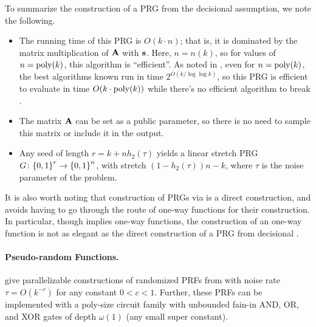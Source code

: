 To summarize the construction of a PRG from the decisional \LPN assumption, we note the following.
\begin{itemize}
	\item The running time of this PRG is $O(k\cdot n)$; that is, it is dominated by the matrix multiplication of ${\mathbf A}$ with ${\mathbf s}$.
	Here, $n = n(k)$, so for values of $n = \operatorname{poly}(k)$, this algorithm is ``efficient''.
	As noted in , even for $n = \operatorname{poly}(k)$, the best algorithms known run in time $2^{O(k/\log\log k)}$, so this PRG is efficient to evaluate in time $O(k\cdot\operatorname{poly}(k))$ while there's no efficient algorithm to break \LPN.
	\item The matrix ${\mathbf A}$ can be set as a public parameter, so there is no need to sample this matrix or include it in the output.
	\item Any seed of length $r = k + nh_2(\tau)$ yields a linear stretch PRG $G \colon {\{0,1\}}^r \rightarrow {\{0,1\}}^n$, with stretch $(1-h_2(\tau))n - k$, where $\tau$ is the noise parameter of the \LPN problem.
\end{itemize}
It is also worth noting that construction of PRGs via \LPN is a direct construction, and avoids having to go through the route of one-way functions for their construction.
In particular, though \LPN implies one-way functions, the construction of an \LPN one-way function is not as elegant as the direct construction of a PRG from decisional \LPN.


\paragraph{Pseudo-random Functions.} \cite{C:YuZha16} give parallelizable constructions of randomized PRFs from \LPN with noise rate $\tau = O(k^{-c})$ for any constant $0 < c < 1$.
Further, these PRFs can be implemented with a poly-size circuit family with unbounded fain-in AND, OR, and XOR gates of depth $\omega(1)$ (any small super constant).

